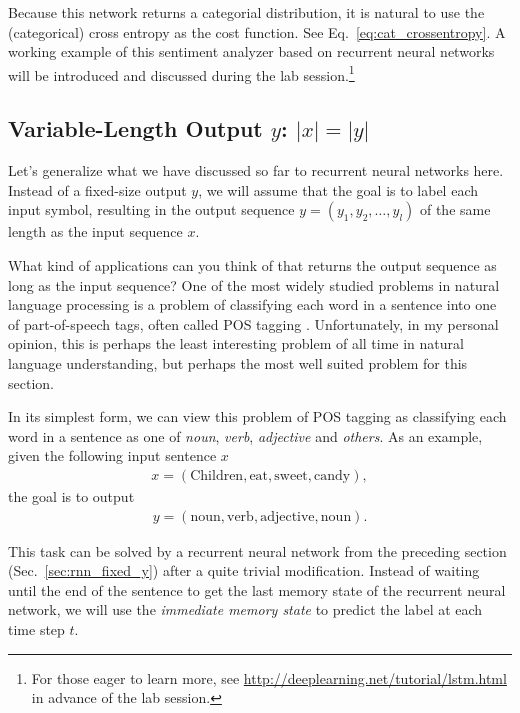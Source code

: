 \documentclass{report}
\begin{document}
Because this network returns a categorial distribution, it is natural to use the
(categorical) cross entropy as the cost function. See
Eq.~\eqref{eq:cat_crossentropy}. A working example of this sentiment analyzer
based on recurrent neural networks will be introduced and discussed during the
lab session.\footnote{
    For those eager to learn more, see
    \url{http://deeplearning.net/tutorial/lstm.html} in advance of the lab
    session.
}


\subsection{Variable-Length Output $y$: $|x|=|y|$}
\label{sec:rnn_x_y}

Let's generalize what we have discussed so far to recurrent neural networks
here. Instead of a fixed-size output $y$, we will assume that the goal is to
label each input symbol, resulting in the output sequence $y=(y_1, y_2, \ldots,
y_l)$ of the same length as the input sequence $x$.

What kind of applications can you think of that returns the output sequence as
long as the input sequence? One of the most widely studied problems in natural
language processing is a problem of classifying each word in a sentence into one
of part-of-speech tags, often called POS tagging
\citep[see Sec.~3.1 of][]{manning1999foundations}. Unfortunately, in my personal opinion, this is
perhaps the least interesting problem of all time in natural language
understanding, but perhaps the most well suited problem for this section.

In its simplest form, we can view this problem of POS tagging as classifying
each word in a sentence as one of {\em noun}, {\em verb}, {\em adjective} and
{\em others}. As an example, given the following input sentence $x$
\begin{align*}
    x = (\text{Children}, \text{eat}, \text{sweet}, \text{candy}),
\end{align*}
the goal is to output
\begin{align*}
    y = (\text{noun}, \text{verb}, \text{adjective}, \text{noun}).
\end{align*}

This task can be solved by a recurrent neural network from the preceding section
(Sec.~\ref{sec:rnn_fixed_y}) after a quite trivial modification. Instead of
waiting until the end of the sentence to get the last memory state of the
recurrent neural network, we will use the {\em immediate memory state} to
predict the label at each time step $t$. 
\end{document}
